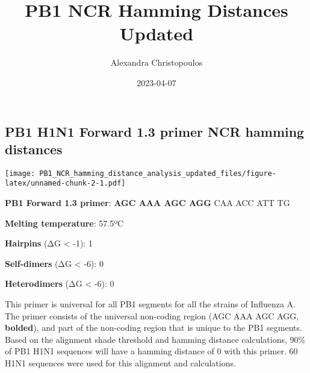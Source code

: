 \documentclass[
]{article}
\title{PB1 NCR Hamming Distances Updated}
\author{Alexandra Christopoulos}
\date{2023-04-07}
\newenvironment{Shaded}{\begin{snugshade}}{\end{snugshade}}
\newcommand{\AttributeTok}[1]{\textcolor[rgb]{0.77,0.63,0.00}{#1}}
\newcommand{\DecValTok}[1]{\textcolor[rgb]{0.00,0.00,0.81}{#1}}
\newcommand{\FunctionTok}[1]{\textcolor[rgb]{0.00,0.00,0.00}{#1}}
\newcommand{\NormalTok}[1]{#1}
\newcommand{\OtherTok}[1]{\textcolor[rgb]{0.56,0.35,0.01}{#1}}
\newcommand{\SpecialCharTok}[1]{\textcolor[rgb]{0.00,0.00,0.00}{#1}}
\newcommand{\StringTok}[1]{\textcolor[rgb]{0.31,0.60,0.02}{#1}}
\begin{document}
\maketitle

\hypertarget{pb1-h1n1-forward-1.3-primer-ncr-hamming-distances}{%
\subsection{PB1 H1N1 Forward 1.3 primer NCR hamming
distances}\label{pb1-h1n1-forward-1.3-primer-ncr-hamming-distances}}

\begin{Shaded}
\end{Shaded}

\texttt{[image: PB1\_NCR\_hamming\_distance\_analysis\_updated\_files/figure-latex/unnamed-chunk-2-1.pdf]}

\textbf{PB1 Forward 1.3 primer}: \textbf{AGC AAA AGC AGG} CAA ACC ATT TG

\textbf{Melting temperature}: 57.5ºC

\textbf{Hairpins} (ΔG \textless{} -1): 1

\textbf{Self-dimers} (ΔG \textless{} -6): 0

\textbf{Heterodimers} (ΔG \textless{} -6): 0

This primer is universal for all PB1 segments for all the strains of
Influenza A. The primer consists of the universal non-coding region (AGC
AAA AGC AGG, \textbf{bolded}), and part of the non-coding region that is
unique to the PB1 segments. Based on the alignment shade threshold and
hamming distance calculations, 90\% of PB1 H1N1 sequences will have a
hamming distance of 0 with this primer. 60 H1N1 sequences were used for
this alignment and calculations.
\end{document}
